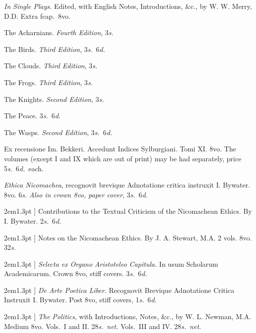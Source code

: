\documentclass[12pt,oneside]{book}[2021/10/04]
\newcommand{\longdash}{\rule[.5ex]{2em}{1.3pt}
}
\newenvironment{advlist}{
  \begin{description}[leftmargin=1em, parsep=0.2ex, listparindent=1em,]
}{\end{description}}
\newenvironment{vollist}{
\begin{description}[nosep, topsep=-1ex, itemindent=-1em, leftmargin=2em]
}{\end{description}}
\newcommand{\¬}{\hphantom{0}}
\begin{document}
\begin{advlist}
\item[Aristophanes.] \textit{In Single Plays.}
Edited, with English Notes, Introductions,
\&c., by W. W. Merry, D.D.
Extra fcap.\ 8vo.
\begin{vollist}
\item The Acharnians. \textit{Fourth Edition}, 3\textit{s.}
\item The Birds. \textit{Third Edition}, 3\textit{s.}\ 6\textit{d.}
\item The Clouds. \textit{Third Edition}, 3\textit{s.}
\item The Frogs. \textit{Third Edition}, 3\textit{s.}
\item The Knights. \textit{Second Edition}, 3\textit{s.}
\item The Peace. 3\textit{s.}\ 6\textit{d.}
\item The Wasps. \textit{Second Edition}, 3\textit{s.}\ 6\textit{d.}
\end{vollist}

\item[Aristotle.] Ex recensione
Im. Bekkeri. Accedunt Indices
Sylburgiani. Tomi XI. 8vo. The
volumes (except I and IX which are
out of print) may be had separately,
price 5\textit{s.}\ 6\textit{d.}\ each.

\item[Aristotle.] \textit{Ethica Nicomachea},
recognovit brevique Adnotatione
critica instruxit I. Bywater. 8vo. 6\textit{s.}
\textit{Also in crown 8vo, paper cover}, 3\textit{s.}\ 6\textit{d.}

\item[\longdash] Contributions to the
Textual Criticism of the Nicomachean
Ethics. By I. Bywater. 2\textit{s.}\ 6\textit{d.}

\item[\longdash] Notes on the Nicomachean
Ethics. By J. A. Stewart, M.A.
2 vols. 8vo. 32\textit{s.}

\item[\longdash] \textit{Selecta ex Organo Aristoteleo
Capitula.} In usum Scholarum
Academicarum. Crown 8vo,
stiff covers. 3\textit{s.}\ 6\textit{d.}

\item[\longdash] \textit{De Arte Poetica Liber.}
Recognovit Brevique Adnotatione
Critica Instruxit I. Bywater. Post
8vo, stiff covers, 1\textit{s.}\ 6\textit{d.}

\item[\longdash] \textit{The Politics}, with Introductions,
Notes, \&c., by W. L. Newman,
M.A. Medium 8vo. Vols.\ I
and II. 28\textit{s.}\ \textit{net.} Vols.\ III and
IV. 28\textit{s.}\ \textit{net.}


\end{advlist}
\end{document}
